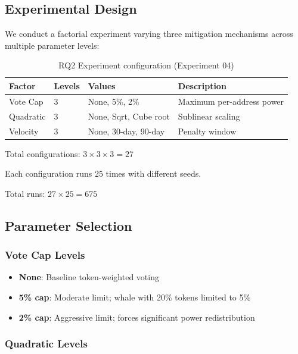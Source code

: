 
\subsection{Experimental Design}

We conduct a factorial experiment varying three mitigation mechanisms across multiple parameter levels:

\begin{table}[htbp]
\centering
\caption{RQ2 Experiment configuration (Experiment 04)}
\label{tab:rq2-experiment}
\begin{tabular}{@{}llll@{}}
\toprule
Factor & Levels & Values & Description \\
\midrule
Vote Cap & 3 & None, 5\%, 2\% & Maximum per-address power \\
Quadratic & 3 & None, Sqrt, Cube root & Sublinear scaling \\
Velocity & 3 & None, 30-day, 90-day & Penalty window \\
\bottomrule
\end{tabular}
\end{table}

Total configurations: $3 \times 3 \times 3 = 27$

Each configuration runs 25 times with different seeds.

Total runs: $27 \times 25 = 675$

\subsection{Parameter Selection}

\subsubsection{Vote Cap Levels}

\begin{itemize}
    \item \textbf{None}: Baseline token-weighted voting
    \item \textbf{5\% cap}: Moderate limit; whale with 20\% tokens limited to 5\%
    \item \textbf{2\% cap}: Aggressive limit; forces significant power redistribution
\end{itemize}

\subsubsection{Quadratic Levels}

